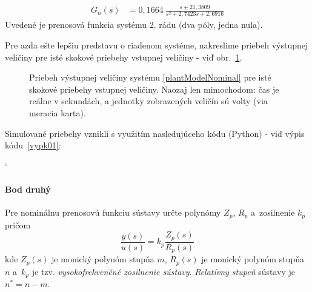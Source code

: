 \documentclass[a4paper, 10pt, ]{article}
\begin{document}
\begin{align}
    G_{n}(s) &= 0,1664 \  \frac{s + 21,3809}{ s^2 + 2,7423 s + 2,6916} \label{plantModelNominal}
\end{align}
Uvedené je prenosová funkcia systému 2. rádu (dva póly, jedna nula).


Pre azda ešte lepšiu predstavu o riadenom systéme, nakreslime priebeh výstupnej veličiny pre isté skokové priebehy vstupnej veličiny - viď obr.~\ref{figsc_ar06_MRC_lenRS_1}.



\begin{figure}[!ht]
	\centering


	\caption{Priebeh výstupnej veličiny systému \eqref{plantModelNominal} pre isté skokové priebehy vstupnej veličiny. Naozaj len mimochodom: čas je reálne v sekundách, a jednotky zobrazených veličín sú volty (via meracia karta).}
	\label{figsc_ar06_MRC_lenRS_1}

\end{figure}



Simulované priebehy vznikli s využitím nasledujúceho kódu (Python) - viď výpis kódu~\ref{vypk01}:


{\catcode`

}







\paragraph{Bod druhý}

{\color{gray}

Pre nominálnu prenosovú funkciu sústavy určte polynómy $Z_p$, $R_p$ a~zosilnenie $k_p$ pričom
\begin{equation*}
       \frac{y(s)}{u(s)} = k_p \frac{Z_p(s)}{R_p(s)}
\end{equation*}
kde $Z_p(s)$ je monický  polynóm stupňa $m$, $R_p(s)$ je monický polynóm stupňa $n$ a~$k_p$ je tzv. \emph{vysokofrekvenčné zosilnenie sústavy}. \emph{Relatívny stupeň} sústavy je $n^* = n - m$.

}
\end{document}
